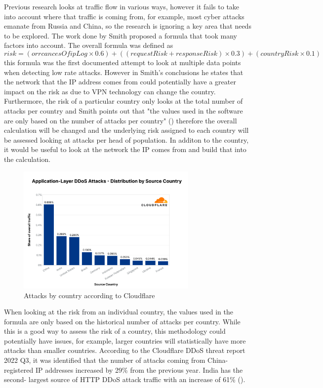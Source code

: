 Previous research looks at traffic flow in various ways, however it fails to take into account where that traffic is coming from, for example, most cyber attacks emanate from Russia and China, so the research is ignoring a key area that needs to be explored. The work done by Smith proposed a formula that took many factors  into account. The overall formula was defined as  \[risk = (orrcancesOfipLog \times 0.6) + ((requestRisk+responseRisk) \times 0.3) + (countryRisk \times  0.1) \] this formula was the first documented  attempt to look at multiple data points when detecting low rate attacks. However in Smith's conclusions he states that the network that the IP address comes from could potentially have a greater impact on the risk as due to VPN technology can change the country. Furthermore, the risk of a particular country only looks at the total number of attacks per country and Smith points out that  "the values used in the software are only based on the number of attacks per country" (\cite{smith}) therefore the overall calculation will be changed and the underlying risk assigned to each country will be assessed looking at attacks per head of population. In additon to the country, it would be useful to look at the network the IP comes from and build that into the calculation. 

\begin{figure}
\label{web using h2}
    \includegraphics[width=88mm,scale=0.4]{images/CF q3.png} 
    \caption{Attacks by country according to Cloudflare}
\end{figure}
When looking at the risk from an individual country, the values used in the formula are only based on the historical number of attacks per country. While this is a good way to assess the risk of a country, this methodology could potentially have issues, for example, larger countries will statistically have more attacks than smaller countries. According to the Cloudflare DDoS threat report 2022 Q3, it was identified that the number of attacks coming from China- registered IP addresses increased by 29\% from the previous year. India has the second- largest source of HTTP DDoS attack traffic with an increase of 61\% (\cite{Q3attacks}).


